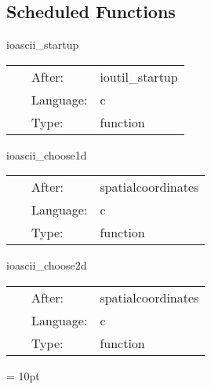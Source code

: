 \documentclass{article}
\begin{document}
\subsection*{Scheduled Functions}
\vspace{5mm}


\hspace{5mm} ioascii\_startup 

\hspace{5mm}{\it startup routine } 


\hspace{5mm}

 \begin{tabular*}{160mm}{cll} 
~ & After:  & ioutil\_startup \\ 
~ & Language:  & c \\ 
~ & Type:  & function \\ 
\end{tabular*} 


\vspace{5mm}


\hspace{5mm} ioascii\_choose1d 

\hspace{5mm}{\it choose 1d output lines } 


\hspace{5mm}

 \begin{tabular*}{160mm}{cll} 
~ & After:  & spatialcoordinates \\ 
~ & Language:  & c \\ 
~ & Type:  & function \\ 
\end{tabular*} 


\vspace{5mm}


\hspace{5mm} ioascii\_choose2d 

\hspace{5mm}{\it choose 2d output planes } 


\hspace{5mm}

 \begin{tabular*}{160mm}{cll} 
~ & After:  & spatialcoordinates \\ 
~ & Language:  & c \\ 
~ & Type:  & function \\ 
\end{tabular*} 



\vspace{5mm}\parskip = 10pt 
\end{document}
